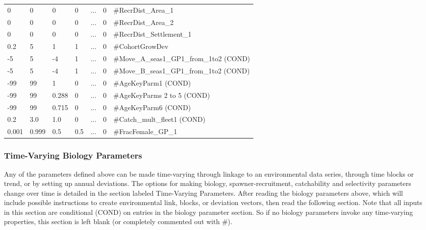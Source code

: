 \begin{longtable}{p{1.1cm} p{1.1cm} p{1.1cm}  p{1.1cm}  p{1.5cm}  p{1.1cm}  p{6.75cm}  }
	 0   & 0    & 0    & 0    & \multicolumn{1}{c}{...} & 0 & \#RecrDist\_Area\_1 \\
	 0   & 0    & 0    & 0    & \multicolumn{1}{c}{...} & 0 & \#RecrDist\_Area\_2 \\
	 0   & 0    & 0    & 0    & \multicolumn{1}{c}{...} & 0 & \#RecrDist\_Settlement\_1 \\
	 0.2 & 5    & 1    & 1    & \multicolumn{1}{c}{...} & 0 & \#CohortGrowDev \\
	-5   & 5    & -4   & 1    & \multicolumn{1}{c}{...} & 0 & \#Move\_A\_seas1\_GP1\_from\_1to2 (COND)\\
    -5   & 5    & -4   & 1    & \multicolumn{1}{c}{...} & 0 & \#Move\_B\_seas1\_GP1\_from\_1to2 (COND)\\
	-99  & 99   &  1   & 0    & \multicolumn{1}{c}{...} & 0 & \#AgeKeyParm1 (COND)\\
	-99  & 99   &  0.288   & 0    & ... & 0 & \#AgeKeyParms 2 to 5 (COND)\\
	-99  & 99   &  0.715   & 0    & ... & 0 & \#AgeKeyParm6 (COND)\\	
	0.2  & 3.0   &  1.0   & 0    & ... & 0 & \#Catch\_mult\_fleet1 (COND)\\
	0.001 & 0.999 & 0.5 & 0.5    & ... & 0 & \#FracFemale\_GP\_1 \Bstrut\\		
	\hline
\end{longtable}


\hypertarget{tvOrder}{}
\subsubsection{Time-Varying Biology Parameters}
Any of the parameters defined above can be made time-varying through linkage to an environmental data series, through time blocks or trend, or by setting up annual deviations.  The options for making biology, spawner-recruitment,  catchability and selectivity parameters change over time is detailed in the section labeled Time-Varying Parameters.  After reading the biology parameters above, which will include possible instructions to create environmental link, blocks, or deviation vectors, then read the following section.  Note that all inputs in this section are conditional (COND) on entries in the biology parameter section.  So if no biology parameters invoke any time-varying properties, this section is left blank (or completely commented out with \#).

